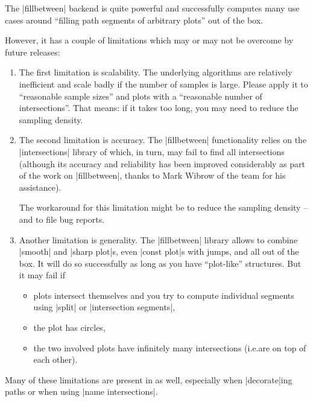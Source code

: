 The |fillbetween| backend is quite powerful and successfully computes many use
cases around ``filling path segments of arbitrary plots'' out of the box.

However, it has a couple of limitations which may or may not be overcome by
future releases:
%
\begin{enumerate}
    \item The first limitation is scalability. The underlying algorithms are
        relatively inefficient and scale badly if the number of samples is
        large. Please apply it to ``reasonable sample sizes'' and plots with
        a ``reasonable number of intersections''. That means: if it takes too
        long, you may need to reduce the sampling density.
    \item The second limitation is accuracy. The |fillbetween| functionality
        relies on the |intersections| library of \pgfname{} which, in turn,
        may fail to find all intersections (although its accuracy and
        reliability has been improved considerably as part of the work on
        |fillbetween|, thanks to Mark Wibrow of the \pgfname{} team for his
        assistance).

        The workaround for this limitation might be to reduce the sampling
        density -- and to file bug reports.
    \item Another limitation is generality. The |fillbetween| library allows
        to combine |smooth| and |sharp plot|s, even |const plot|s with jumps,
        and all out of the box. It will do so successfully as long as you
        have ``plot-like'' structures. But it may fail if
        \begin{itemize}
            \item plots intersect themselves and you try to compute
                individual segments using |split| or
                |intersection segments|,
            \item the plot has circles,
            \item the two involved plots have infinitely many intersections
                (i.e.\@ are on top of each other).
        \end{itemize}
\end{enumerate}
%
Many of these limitations are present in \pgfname{} as well, especially when
|decorate|ing paths or when using |name intersections|.
\endgroup
